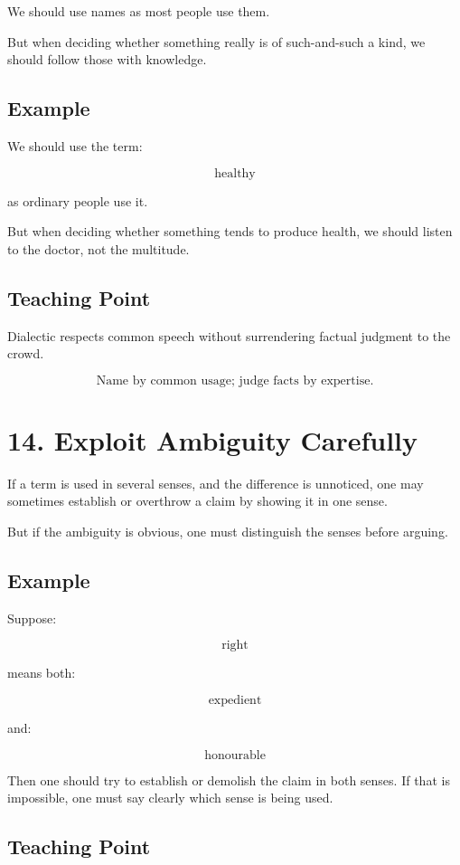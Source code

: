 \documentclass[12pt]{article}
\begin{document}
We should use names as most people use them.

But when deciding whether something really is of such-and-such a kind, we
should follow those with knowledge.

\subsection*{Example}

We should use the term:

\[
\text{healthy}
\]

as ordinary people use it.

But when deciding whether something tends to produce health, we should listen
to the doctor, not the multitude.

\subsection*{Teaching Point}

Dialectic respects common speech without surrendering factual judgment to the
crowd.

\[
\boxed{
\text{Name by common usage; judge facts by expertise.}
}
\]

\section*{14. Exploit Ambiguity Carefully}

If a term is used in several senses, and the difference is unnoticed, one may
sometimes establish or overthrow a claim by showing it in one sense.

But if the ambiguity is obvious, one must distinguish the senses before arguing.

\subsection*{Example}

Suppose:

\[
\text{right}
\]

means both:

\[
\text{expedient}
\]

and:

\[
\text{honourable}
\]

Then one should try to establish or demolish the claim in both senses. If that
is impossible, one must say clearly which sense is being used.

\subsection*{Teaching Point}
\end{document}
